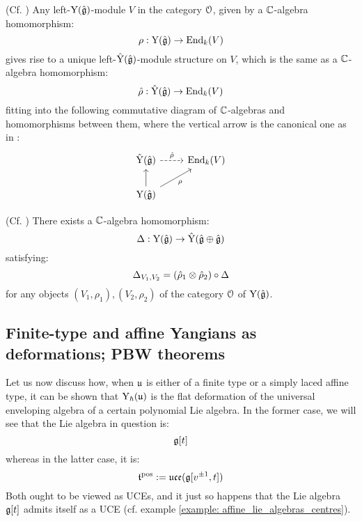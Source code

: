         \begin{lemma} \label{lemma: lifting_representations_of_affine_yangians_to_root_grading_completions}
            (Cf. \cite[Proposition 5.14]{guay_nakajima_wendlandt_affine_yangian_coproduct}) Any left-$\mathrm{Y}(\hat{\mathfrak{g}})$-module $V$ in the category $\mathcal{O}$, given by a $\mathbb{C}$-algebra homomorphism:
                $$\rho: \mathrm{Y}(\hat{\mathfrak{g}}) \to \mathrm{End}_k(V)$$
            gives rise to a unique left-$\hat{\mathrm{Y}}(\hat{\mathfrak{g}})$-module structure on $V$, which is the same as a $\mathbb{C}$-algebra homomorphism:
                $$\hat{\rho}: \hat{\mathrm{Y}}(\hat{\mathfrak{g}}) \to \mathrm{End}_k(V)$$
            fitting into the following commutative diagram of $\mathbb{C}$-algebras and homomorphisms between them, where the vertical arrow is the canonical one as in \cite[Section 5, Lemma 5.3]{guay_nakajima_wendlandt_affine_yangian_coproduct}:
                $$
                    \begin{tikzcd}
                	{\hat{\rmY}(\hat{\g})} & {\End_k(V)} \\
                	{\rmY(\hat{\g})}
                	\arrow[from=2-1, to=1-1]
                	\arrow["{\hat{\rho}}", dashed, from=1-1, to=1-2]
                	\arrow["\rho"', from=2-1, to=1-2]
                    \end{tikzcd}
                $$
        \end{lemma}
        \begin{theorem} \label{theorem: hopf_coproduct_on_yangians}
            (Cf. \cite[Proposition 5.18]{guay_nakajima_wendlandt_affine_yangian_coproduct}) There exists a $\mathbb{C}$-algebra homomorphism:
                $$\Delta: \mathrm{Y}(\hat{\mathfrak{g}}) \to \hat{\mathrm{Y}}(\hat{\mathfrak{g}} \oplus \hat{\mathfrak{g}})$$
            satisfying:
                $$\Delta_{V_1, V_2} = (\hat{\rho}_1 \tensor \hat{\rho}_2) \circ \Delta$$
            for any objects $(V_1, \rho_1), (V_2, \rho_2)$ of the category $\mathcal{O}$ of $\mathrm{Y}(\hat{\mathfrak{g}})$.
        \end{theorem}

        \begin{theorem} \label{theorem: hopf_coproduct_on_formal_yangians}
        \end{theorem}

    \subsection{Finite-type and affine Yangians as deformations; PBW theorems} \label{subsection: yangians_as_deformations}
        Let us now discuss how, when $\mathfrak{u}$ is either of a finite type or a simply laced affine type, it can be shown that $\mathrm{Y}_{\hbar}(\mathfrak{u})$ is the flat deformation of the universal enveloping algebra of a certain polynomial Lie algebra. In the former case, we will see that the Lie algebra in question is:
            $$\mathfrak{g}[t]$$
        whereas in the latter case, it is:
            $$\mathfrak{t}^{\mathrm{pos}} := \mathfrak{uce}(\mathfrak{g}[v^{\pm 1}, t])$$
        Both ought to be viewed as UCEs, and it just so happens that the Lie algebra $\mathfrak{g}[t]$ admits itself as a UCE (cf. example \ref{example: affine_lie_algebras_centres}).

